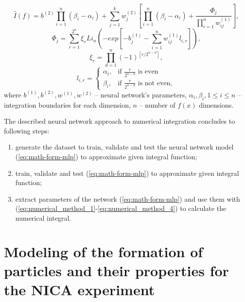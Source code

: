 \documentclass[%
]{ittmm}
\begin{document}
\begin{equation}
        \label{eq:numerical_method_1}
            \hat{I}(f) = b^{(2)}\prod_{i=1}^{n}(\beta_i - \alpha_i) + \sum_{j=1}^{k}w_j^{(2)}[\prod_{i=1}^{n}(\beta_i - \alpha_i) + \frac{\Phi_j}{\prod_{i=1}^{n}w_{ij}^{(1)}}],
        \end{equation}
        \begin{equation}
        \label{eq:numerical_method_2}
            \Phi_j = \sum_{r=1}^{2^n}\xi_{r}Li_n(-exp[-b_j^{(1)} - \sum_{i=1}^{n}w_{ij}^{(1)}l_{i,r}]),
        \end{equation}
        \begin{equation}
        \label{eq:numerical_method_3}
            \xi_{r} = \prod_{d=1}^{n}(-1)^{[{r}/{2^{n-d}}]},
        \end{equation}
        \begin{equation}
        \label{eq:numerical_method_4}
            l_{i,r} = \left\{
            \begin{array}{ll}
                \alpha_i, & \text{if } \frac{r}{2^{n-d}} \text{ is even} \\
                \beta_i, & \text{if } \frac{r}{2^{n-d}} \text{ is not even},
            \end{array}
        \right.
\end{equation}
    where $b^{(1)}, b^{(2)}, w^{(1)}, w^{(2)}$ -- neural network's parameters, $\alpha_i, \beta_i, 1 \leq i \leq n$ -- integration boundaries for each dimension, $n$ -- number of $ f(x) $ dimensions.

The described neural network approach to numerical integration concludes to following steps:

\begin{enumerate}
    \item generate the dataset to train, validate and test the neural network model (\ref{eq:math-form-mlp}) to approximate given integral function;
    \item train, validate and test (\ref{eq:math-form-mlp}) to approximate given integral function;
    \item extract parameters of the network (\ref{eq:math-form-mlp}) and use them with (\ref{eq:numerical_method_1}-\ref{eq:numerical_method_4}) to calculate the numerical integral.
\end{enumerate}

\section{Modeling of the  formation of particles and their properties for the NICA experiment}
\end{document}
